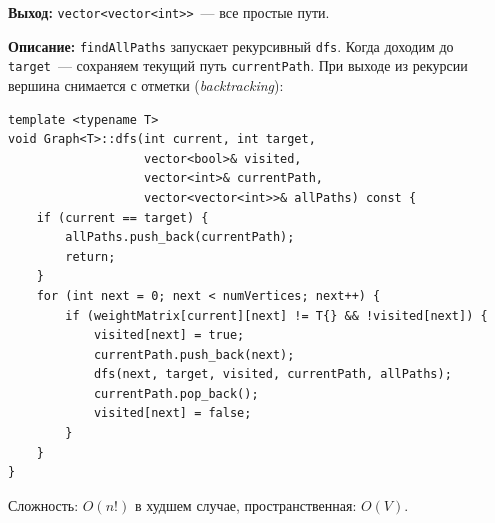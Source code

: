 \textbf{Выход:} \texttt{vector<vector<int>>}~--- все простые пути.

\textbf{Описание:} \texttt{findAllPaths} запускает рекурсивный \texttt{dfs}.
Когда доходим до \texttt{target}~--- сохраняем текущий путь \texttt{currentPath}.
При выходе из рекурсии вершина снимается с отметки (\textit{backtracking}):

\begin{lstlisting}[style=cstyle, caption={Поиск всех путей DFS (graph.cpp)}]
template <typename T>
void Graph<T>::dfs(int current, int target,
                   vector<bool>& visited,
                   vector<int>& currentPath,
                   vector<vector<int>>& allPaths) const {
    if (current == target) {
        allPaths.push_back(currentPath);
        return;
    }
    for (int next = 0; next < numVertices; next++) {
        if (weightMatrix[current][next] != T{} && !visited[next]) {
            visited[next] = true;
            currentPath.push_back(next);
            dfs(next, target, visited, currentPath, allPaths);
            currentPath.pop_back();
            visited[next] = false;
        }
    }
}
\end{lstlisting}

Сложность: $O(n!)$ в худшем случае, пространственная: $O(V)$.
